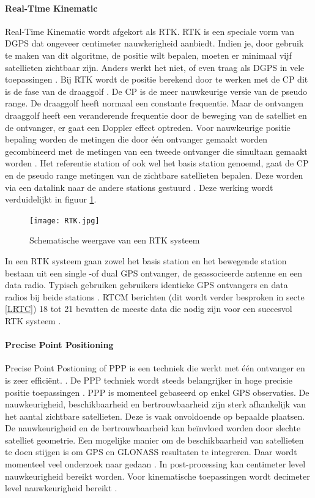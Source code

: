 \paragraph{Real-Time Kinematic}
Real-Time Kinematic wordt afgekort als RTK. RTK is een speciale vorm van DGPS dat ongeveer centimeter nauwkerigheid aanbiedt. Indien je, door gebruik te maken van dit algoritme, de positie wilt bepalen, moeten er minimaal vijf satellieten zichtbaar zijn. Anders werkt het niet, of even traag als DGPS in vele toepassingen \cite{LBibRTK}. Bij RTK wordt de positie berekend door te werken met de CP dit is de fase van de draaggolf \cite{LBibRTK2}. De CP is de meer nauwkeurige versie van de pseudo range. De draaggolf heeft normaal een constante frequentie. Maar de ontvangen draaggolf heeft een veranderende frequentie door de beweging van de satelliet en de ontvanger, er gaat een Doppler effect optreden. Voor nauwkeurige positie bepaling worden de metingen die door \'e\'en ontvanger gemaakt worden gecombineerd met de metingen van een tweede ontvanger die simultaan gemaakt worden \cite{LBibRTK3}. Het referentie station of ook wel het basis station genoemd, gaat de CP en de pseudo range metingen van de zichtbare satellieten bepalen. Deze worden via een datalink naar de andere stations gestuurd \cite{LBibDGPS}. Deze werking wordt verduidelijkt in figuur \ref{imgRTK}. 

\begin{figure}[h!bp]
	\texttt{[image: RTK.jpg]}
	\centering
	\caption{Schematische weergave van een RTK systeem \cite{LBibDGPS}}
	\label{imgRTK}
\end{figure}

In een RTK systeem gaan zowel het basis station en het bewegende station bestaan uit een single -of dual GPS ontvanger, de geassocieerde antenne en een data radio. Typisch gebruiken gebruikers identieke GPS ontvangers en data radios bij beide stations \cite{LBibRTK3}. RTCM berichten (dit wordt verder besproken in secte \ref{LRTC}) 18 tot 21 bevatten de meeste data die nodig zijn voor een succesvol RTK systeem \cite{LBibDGPS} .


\paragraph{Precise Point Positioning}
Precise Point Postioning of PPP is een techniek die werkt met \'e\'en ontvanger en is zeer effici\"ent. \cite{LBibGNSS4}. De PPP techniek wordt steeds belangrijker in hoge precisie positie toepassingen \cite{LBibPPP2}. PPP is momenteel gebaseerd op enkel GPS observaties. De nauwkeurigheid, beschikbaarheid en bertrouwbaarheid zijn sterk afhankelijk van het aantal zichtbare satellieten. Deze is vaak onvoldoende op bepaalde plaatsen. De nauwkeurigheid en de bertrouwbaarheid kan be\"invloed worden door slechte satelliet geometrie. Een mogelijke manier om de beschikbaarheid van satellieten te doen stijgen is om GPS en GLONASS resultaten te integreren. Daar wordt momenteel veel onderzoek naar gedaan \cite{LBibPPP}. In post-processing kan centimeter level nauwkeurigheid bereikt worden. Voor kinematische toepassingen wordt decimeter level nauwkeurigheid bereikt \cite{LBibGPS2}.  

